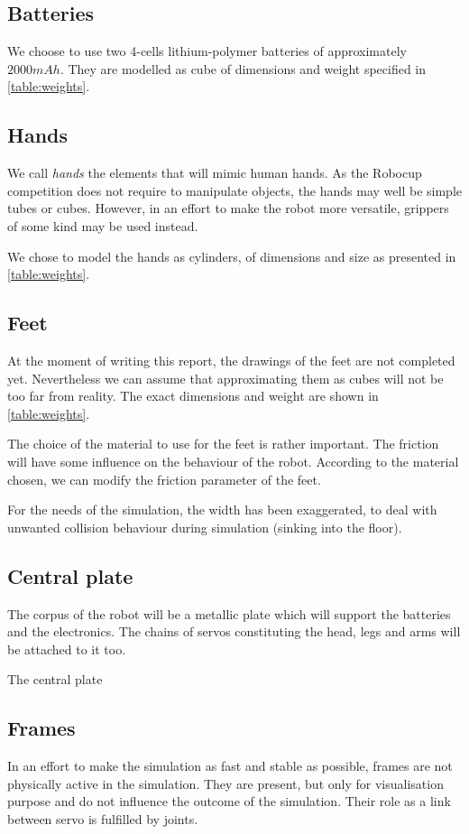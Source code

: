 \subsection{Batteries}
We choose to use two 4-cells lithium-polymer batteries of approximately $2000mAh$. They are modelled as cube of dimensions and weight specified in \cref{table:weights}.

\subsection{Hands}
We call \emph{hands} the elements that will mimic human hands. As the Robocup competition does not require to manipulate objects, the hands may well be simple tubes or cubes. However, in an effort to make the robot more versatile, grippers of some kind may be used instead.

We chose to model the hands as cylinders, of dimensions and size as presented in \cref{table:weights}.

\subsection{Feet}
At the moment of writing this report, the drawings of the feet are not completed yet. Nevertheless we can assume that approximating them as cubes will not be too far from reality. The exact dimensions and weight are shown in \cref{table:weights}.

The choice of the material to use for the feet is rather important. The friction will have some influence on the behaviour of the robot. According to the material chosen, we can modify the friction parameter of the feet.

For the needs of the simulation, the width has been exaggerated, to deal with unwanted collision behaviour during simulation (sinking into the floor). 

\subsection{Central plate}
The corpus of the robot will be a metallic plate which will support the batteries and the electronics. The chains of servos constituting the head, legs and arms will be attached to it too.

The central plate 

\subsection{Frames}
In an effort to make the simulation as fast and stable as possible, frames are not physically active in the simulation. They are present, but only for visualisation purpose and do not influence the outcome of the simulation. Their role as a link between servo is fulfilled by joints.

